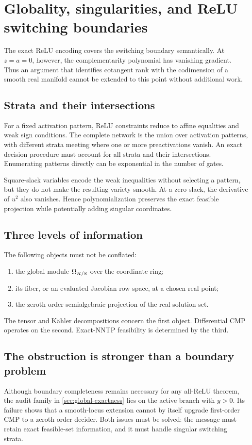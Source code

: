\section{Globality, singularities, and ReLU switching boundaries}
\label{sec:boundary}

The exact ReLU encoding covers the switching boundary semantically.  At
\(z=a=0\), however, the complementarity polynomial has vanishing gradient.
Thus an argument that identifies cotangent rank with the codimension of a
smooth real manifold cannot be extended to this point without additional
work.

\subsection{Strata and their intersections}

For a fixed activation pattern, ReLU constraints reduce to affine equalities
and weak sign conditions.  The complete network is the union over activation
patterns, with different strata meeting where one or more preactivations
vanish.  An exact decision procedure must account for all strata and their
intersections.  Enumerating patterns directly can be exponential in the number
of gates.

Square-slack variables encode the weak inequalities without selecting a
pattern, but they do not make the resulting variety smooth.  At a zero slack,
the derivative of \(u^2\) also vanishes.  Hence polynomialization preserves the
exact feasible projection while potentially adding singular coordinates.

\subsection{Three levels of information}

The following objects must not be conflated:
\begin{enumerate}
  \item the global module \(\Omega_{\mathcal{R}/\mathbb{R}}\) over the coordinate ring;
  \item its fiber, or an evaluated Jacobian row space, at a chosen real point;
  \item the zeroth-order semialgebraic projection of the real solution set.
\end{enumerate}
The tensor and K\"ahler decompositions concern the first object.  Differential
CMP operates on the second.  Exact-NNTP feasibility is determined by the third.

\subsection{The obstruction is stronger than a boundary problem}

Although boundary completeness remains necessary for any all-ReLU theorem,
the audit family in \cref{sec:global-exactness} lies on the active branch with
\(y>0\).  Its failure shows that a smooth-locus extension cannot by itself
upgrade first-order CMP to a zeroth-order decider.  Both issues must be solved:
the message must retain exact feasible-set information, and it must handle
singular switching strata.
